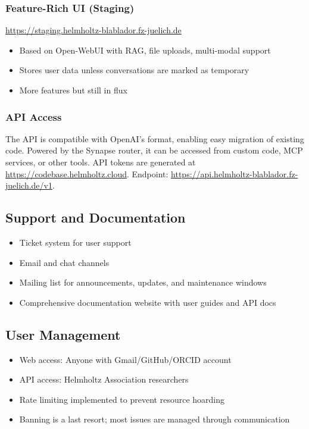 \documentclass[10pt,conference]{IEEEtran}
\begin{document}
\subsubsection{Feature-Rich UI (Staging)}
\url{https://staging.helmholtz-blablador.fz-juelich.de}
\begin{itemize}
    \item Based on Open-WebUI with RAG, file uploads, multi-modal support
    \item Stores user data unless conversations are marked as temporary
    \item More features but still in flux
\end{itemize}

\subsubsection{API Access}
The API is compatible with OpenAI's format, enabling easy migration of existing code. Powered by the Synapse router, it can be accessed from custom code, MCP services, or other tools. API tokens are generated at \url{https://codebase.helmholtz.cloud}. Endpoint: \url{https://api.helmholtz-blablador.fz-juelich.de/v1}.

\subsection{Support and Documentation}
\begin{itemize}
    \item Ticket system for user support
    \item Email and chat channels
    \item Mailing list for announcements, updates, and maintenance windows
    \item Comprehensive documentation website with user guides and API docs
\end{itemize}

\subsection{User Management}
\begin{itemize}
    \item Web access: Anyone with Gmail/GitHub/ORCID account
    \item API access: Helmholtz Association researchers
    \item Rate limiting implemented to prevent resource hoarding
    \item Banning is a last resort; most issues are managed through communication
\end{itemize}
\end{document}
